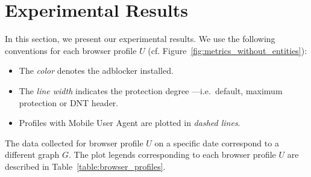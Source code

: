 \section{Experimental Results}
In this section, we present our experimental results. We use the following conventions for each browser profile $U$ (cf. Figure~\ref{fig:metrics_without_entities}):
\begin{itemize}
 \item The \textit{color} denotes the adblocker installed.
 \item The \textit{line width} indicates the protection degree ---i.e.\ default, maximum protection or DNT header.
 \item Profiles with Mobile User Agent are plotted in \textit{dashed lines}.
\end{itemize}
The data collected for browser profile $U$ on a specific date correspond to a different graph $G$. The plot legends corresponding to each browser profile $U$ are described in Table~\ref{table:browser_profiles}.

